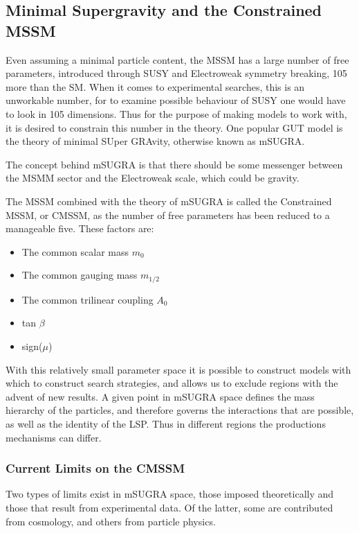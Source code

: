 \subsection{Minimal Supergravity and the Constrained MSSM}

Even assuming a minimal particle content, the MSSM has a large number of free parameters, introduced through SUSY and Electroweak symmetry breaking, 105 more than the SM. When it comes to experimental searches, this is an unworkable number, for to examine possible behaviour of SUSY one would have to look in 105 dimensions. Thus for the purpose of making models to work with, it is desired to constrain this number in the theory. One popular GUT model is the theory of minimal SUper GRAvity, otherwise known as mSUGRA. 

The concept behind mSUGRA is that there should be some messenger between the MSMM sector and the Electroweak scale, which could be gravity. 

The MSSM combined with the theory of mSUGRA is called the Constrained MSSM, or CMSSM, as the number of free parameters has been reduced to a manageable five. These factors are:

\begin{itemize}
\item{The common scalar mass $m_{0}$}
\item{The common gauging mass $m_{1/2}$}
\item{The common trilinear coupling $A_{0}$}
\item{tan $\beta$}
\item{ sign($\mu$)}
\end{itemize} 

With this relatively small parameter space it is possible to construct models with which to construct search strategies, and allows us to exclude regions with the advent of new results. A given point in mSUGRA space defines the mass hierarchy of the particles, and therefore governs the interactions that are possible, as well as the identity of the LSP. Thus in different regions the productions mechanisms can differ. 

\subsubsection{Current Limits on the CMSSM}

Two types of limits exist in mSUGRA space, those imposed theoretically and those that result from experimental data. Of the latter, some are contributed from cosmology, and others from particle physics. 

